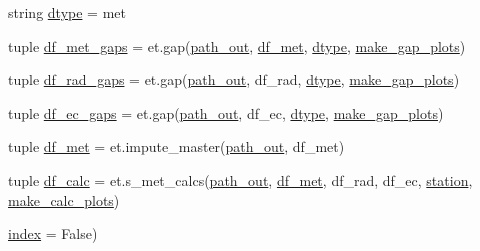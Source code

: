 \begin{DoxyCompactItemize}
\item 
string \hyperlink{namespace_preprocess_01_e_t_a9cd560dc1db09793df2f3871b8831ed9}{dtype} = \textquotesingle{}met\textquotesingle{}
\item 
tuple \hyperlink{namespace_preprocess_01_e_t_aa7538839fde42801e58678f7e872a8e8}{df\+\_\+met\+\_\+gaps} = et.\+gap(\hyperlink{namespace_preprocess_01_e_t_aa8c626406a6808516d849d8b130cd865}{path\+\_\+out}, \hyperlink{namespace_preprocess_01_e_t_a8b58649c3602d34f2ac3b49109f6a47e}{df\+\_\+met}, \hyperlink{namespace_preprocess_01_e_t_a9cd560dc1db09793df2f3871b8831ed9}{dtype}, \hyperlink{namespace_preprocess_01_e_t_ae27e269ff9fd7f96b7639c7417e34ab0}{make\+\_\+gap\+\_\+plots})
\item 
tuple \hyperlink{namespace_preprocess_01_e_t_a9188c05c2546dabdc999c295871c62f3}{df\+\_\+rad\+\_\+gaps} = et.\+gap(\hyperlink{namespace_preprocess_01_e_t_aa8c626406a6808516d849d8b130cd865}{path\+\_\+out}, df\+\_\+rad, \hyperlink{namespace_preprocess_01_e_t_a9cd560dc1db09793df2f3871b8831ed9}{dtype}, \hyperlink{namespace_preprocess_01_e_t_ae27e269ff9fd7f96b7639c7417e34ab0}{make\+\_\+gap\+\_\+plots})
\item 
tuple \hyperlink{namespace_preprocess_01_e_t_a3e29a909f23bb43820f8279794542b1a}{df\+\_\+ec\+\_\+gaps} = et.\+gap(\hyperlink{namespace_preprocess_01_e_t_aa8c626406a6808516d849d8b130cd865}{path\+\_\+out}, df\+\_\+ec, \hyperlink{namespace_preprocess_01_e_t_a9cd560dc1db09793df2f3871b8831ed9}{dtype}, \hyperlink{namespace_preprocess_01_e_t_ae27e269ff9fd7f96b7639c7417e34ab0}{make\+\_\+gap\+\_\+plots})
\item 
tuple \hyperlink{namespace_preprocess_01_e_t_a8b58649c3602d34f2ac3b49109f6a47e}{df\+\_\+met} = et.\+impute\+\_\+master(\hyperlink{namespace_preprocess_01_e_t_aa8c626406a6808516d849d8b130cd865}{path\+\_\+out}, df\+\_\+met)
\item 
tuple \hyperlink{namespace_preprocess_01_e_t_aa5d831074aac0c39a8a6f172474c8913}{df\+\_\+calc} = et.\+s\+\_\+met\+\_\+calcs(\hyperlink{namespace_preprocess_01_e_t_aa8c626406a6808516d849d8b130cd865}{path\+\_\+out}, \hyperlink{namespace_preprocess_01_e_t_a8b58649c3602d34f2ac3b49109f6a47e}{df\+\_\+met}, df\+\_\+rad, df\+\_\+ec, \hyperlink{namespace_preprocess_01_e_t_ae4f8823553a121082c4f553685d82cc3}{station}, \hyperlink{namespace_preprocess_01_e_t_a56359fcc3c93b1624e18648ebd54b0ac}{make\+\_\+calc\+\_\+plots})
\item 
\hyperlink{namespace_preprocess_01_e_t_aadaeace54973ac1d38ec6c6b5267a119}{index} = False)
\end{DoxyCompactItemize}


